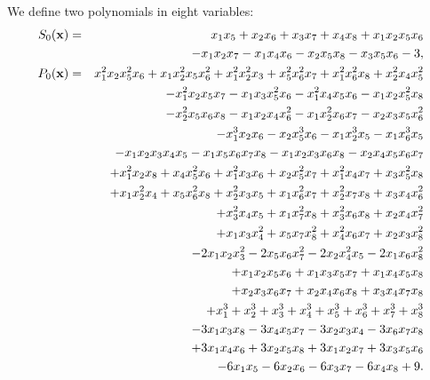 \documentclass[11pt]{amsart}
\numberwithin{equation}{section}
\begin{document}
We define two polynomials in eight variables:
\begin{eqnarray}
\label{eq:S-x} S_0({\bf x}) & = & x_1x_5+x_2x_6+x_3x_7+x_4x_8 +x_1x_2x_5x_6\\
\nonumber		&& \quad -x_1x_2x_7-x_1x_4x_6-x_2x_5x_8-x_3x_5x_6-3, \\
\label{eq:P-x} P_0({\bf x}) 
& = & x_1^2x_2x_5^2x_6+x_1x_2^2x_5x_6^2 
+x_1^2x_2^2x_3+x_5^2x_6^2x_7+x_1^2x_6^2x_8+x_2^2x_4x_5^2 \\
\nonumber && \quad -x_1^2x_2x_5x_7-x_1x_3x_5^2x_6-x_1^2x_4x_5x_6-x_1x_2x_5^2x_8 \\
\nonumber && \quad -x_2^2x_5x_6x_8-x_1x_2x_4x_6^2-x_1x_2^2x_6x_7-x_2x_3x_5x_6^2 \\
\nonumber && \quad -x_1^3x_2x_6-x_2x_5^3x_6-x_1x_2^3x_5-x_1x_6^3x_5 \\
\nonumber && \quad -x_1x_2x_3x_4x_5-x_1x_5x_6x_7x_8-x_1x_2x_3x_6x_8-x_2x_4x_5x_6x_7 \\
\nonumber && \quad +x_1^2x_2x_8+x_4x_5^2x_6+x_1^2x_3x_6+x_2x_5^2x_7+x_1^2x_4x_7+x_3x_5^2x_8 \\
\nonumber && \quad +x_1x_2^2x_4+x_5x_6^2x_8+x_2^2x_3x_5+x_1x_6^2x_7+x_2^2x_7x_8+x_3x_4x_6^2 \\
\nonumber && \quad +x_3^2x_4x_5+x_1x_7^2x_8+x_3^2x_6x_8+x_2x_4x_7^2 \\
\nonumber && \quad +x_1x_3x_4^2+x_5x_7x_8^2+x_4^2x_6x_7+x_2x_3x_8^2 \\
\nonumber & & \quad -2x_1x_2x_3^2-2x_5x_6x_7^2-2x_2x_4^2x_5-2x_1x_6x_8^2\\
\nonumber && \quad +x_1x_2x_5x_6+x_1x_3x_5x_7+x_1x_4x_5x_8 \\
\nonumber && \quad +x_2x_3x_6x_7+x_2x_4x_6x_8+x_3x_4x_7x_8 \\ 
\nonumber && \quad +x_1^3+x_2^3+x_3^3+x_4^3+x_5^3+x_6^3+x_7^3+x_8^3 \\
\nonumber && \quad -3x_1x_3x_8-3x_4x_5x_7-3x_2x_3x_4-3x_6x_7x_8 \\
\nonumber && \quad +3x_1x_4x_6+3x_2x_5x_8+3x_1x_2x_7+3x_3x_5x_6 \\
\nonumber && \quad-6x_1x_5-6x_2x_6-6x_3x_7-6x_4x_8+9.
\end{eqnarray}
\end{document}
